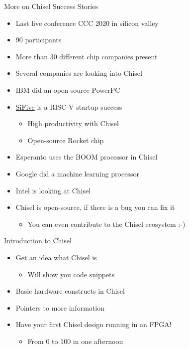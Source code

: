 \begin{frame}[fragile]{More on Chisel Success Stories}
\begin{itemize}
\item Last live conference CCC 2020 in silicon valley
\item 90 participants
\item More than 30 different chip companies present
\item Several companies are looking into Chisel
\item IBM did an open-source PowerPC
\item \href{https://www.sifive.com/}{SiFive} is a RISC-V startup success
\begin{itemize}
\item High productivity with Chisel
\item Open-source Rocket chip
\end{itemize}
\item Esperanto uses the BOOM processor in Chisel
\item Google did a machine learning processor
\item Intel is looking at Chisel
\item Chisel is open-source, if there is a bug you can fix it
\begin{itemize}
\item You can even contribute to the Chisel ecosystem :-)
\end{itemize}
\end{itemize}
\end{frame}

\begin{frame}[fragile]{Introduction to Chisel}
\begin{itemize}
\item Get an idea what Chisel is
\begin{itemize}
\item Will show you code snippets
\end{itemize}
\item Basic hardware constructs in Chisel
\item Pointers to more information
\item Have your first Chisel design running in an FPGA!
\begin{itemize}
\item From 0 to 100 in one afternoon
\end{itemize}\end{itemize}
\end{frame}


